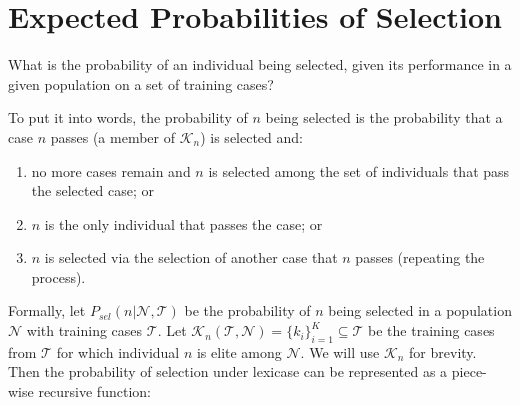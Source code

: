 \documentclass[preprint]{article}
\newcommand*\Let[2]{\State #1 $\gets$ #2}
\begin{document}


\begin{table}

\end{table}
\section{Expected Probabilities of Selection}
What is the probability of an individual being selected, given its performance in a given population on a set of training cases?  



To put it into words, the probability of $n$ being selected is the probability that a case $n$ passes (a member of $\mathcal{K}_n$) is selected and: \begin{enumerate} \item no more cases remain and $n$ is selected among the set of individuals that pass the selected case; or \item $n$ is the only individual that passes the case; or \item $n$ is selected via the selection of another case that $n$ passes (repeating the process). \end{enumerate} 

Formally, let $P_{sel}(n | \mathcal{N}, \mathcal{T})$ be the probability of $n$ being selected in a population $\mathcal{N}$ with training cases $\mathcal{T}$. Let $\mathcal{K}_n(\mathcal{T},\mathcal{N}) = \{k_i\}_{i=1}^K \subseteq \mathcal{T}$ be the training cases from $\mathcal{T}$ for which individual $n$ is elite among $\mathcal{N}$. We will use $\mathcal{K}_n$ for brevity. Then the probability of selection under lexicase can be represented as a piece-wise recursive function: 
\end{document}
